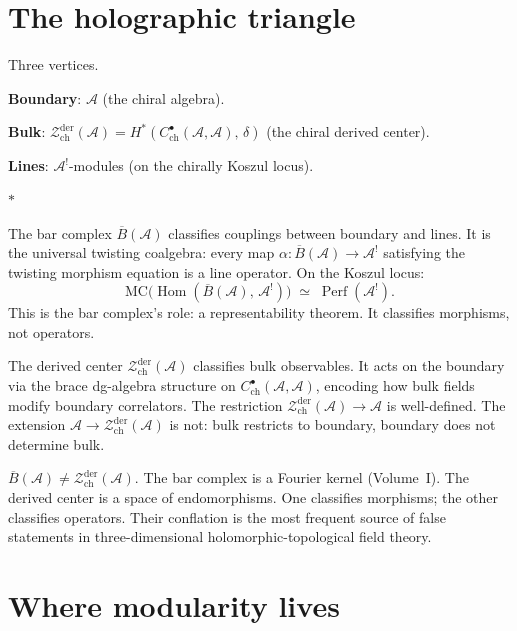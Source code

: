 \documentclass[11pt]{article}
\newcommand{\cA}{\mathcal{A}}
\newcommand{\cZ}{\mathcal{Z}}
\newcommand{\barB}{\overline{B}}
\newcommand{\MC}{\mathrm{MC}}
\newcommand{\Hom}{\operatorname{Hom}}
\newcommand{\Perf}{\operatorname{Perf}}
\newcommand{\Zder}{\cZ^{\mathrm{der}}_{\mathrm{ch}}}
\newcommand{\sep}{\bigskip\begin{center}$*$\end{center}\medskip}
\begin{document}
\section{The holographic triangle}
\label{sec:holographic-triangle}

Three vertices.

\medskip

\noindent
\textbf{Boundary}: $\cA$ (the chiral algebra).

\noindent
\textbf{Bulk}: $\Zder(\cA) = H^*(C^\bullet_{\mathrm{ch}}(\cA,\cA),\,\delta)$
(the chiral derived center).

\noindent
\textbf{Lines}: $\cA^!$-modules (on the chirally Koszul locus).

\sep

The bar complex $\barB(\cA)$ classifies couplings between boundary
and lines.  It is the universal twisting coalgebra: every map
$\alpha\colon \barB(\cA) \to \cA^!$ satisfying the twisting
morphism equation is a line operator.  On the Koszul locus:
\[
\MC\bigl(\Hom(\barB(\cA),\, \cA^!)\bigr)
\;\simeq\;
\Perf(\cA^!).
\]
This is the bar complex's role: a representability theorem.  It
classifies morphisms, not operators.

The derived center $\Zder(\cA)$ classifies bulk observables.
It acts on the boundary via the brace dg-algebra structure
on $C^\bullet_{\mathrm{ch}}(\cA,\cA)$, encoding how bulk fields
modify boundary correlators.  The
restriction $\Zder(\cA) \to \cA$ is well-defined.  The extension
$\cA \to \Zder(\cA)$ is not: bulk restricts to boundary, boundary
does not determine bulk.

\begin{warning}
$\barB(\cA) \neq \Zder(\cA)$.  The bar complex is a Fourier
kernel (Volume~I).  The derived center is a space of
endomorphisms.  One classifies morphisms; the other classifies
operators.  Their conflation is the most frequent source of false
statements in three-dimensional holomorphic-topological field
theory.
\end{warning}


\section{Where modularity lives}
\label{sec:where-modularity-lives}
\end{document}
